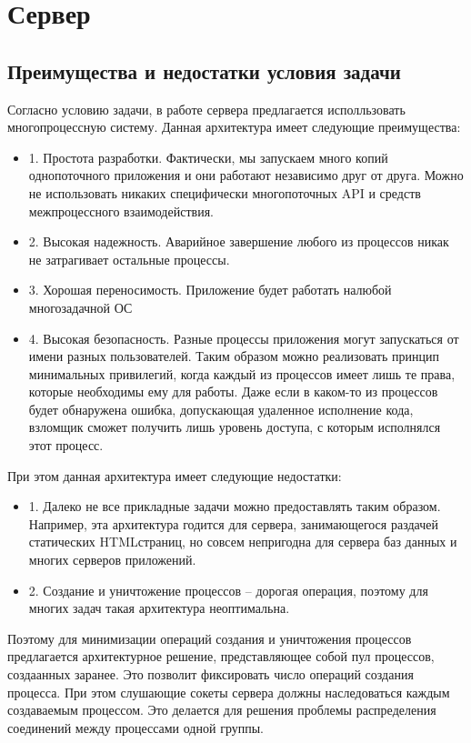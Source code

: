 \documentclass[a4paper,12pt]{report}
\begin{document}
\section*{Сервер}
\subsection*{Преимущества и недостатки условия задачи}
Согласно условию задачи, в работе сервера предлагается исполльзовать многопроцессную систему. Данная архитектура имеет следующие преимущества:
\begin{itemize}
    \item 1. Простота разработки. Фактически, мы запускаем много копий однопоточного приложения и они работают независимо друг от друга. Можно не использовать никаких специфически многопоточных API и средств межпроцессного взаимодействия.
    \item 2. Высокая надежность. Аварийное завершение любого из процессов никак не затрагивает остальные процессы.
    \item 3. Хорошая переносимость. Приложение будет работать налюбой многозадачной ОС
    \item 4. Высокая безопасность. Разные процессы приложения могут запускаться от имени разных пользователей. Таким образом можно реализовать принцип минимальных привилегий, когда каждый из процессов имеет лишь те права, которые необходимы ему для работы. Даже если в каком-то из процессов будет обнаружена ошибка, допускающая удаленное исполнение кода, взломщик сможет получить лишь уровень доступа, с которым исполнялся этот процесс.
\end{itemize}
При этом данная архитектура имеет следующие недостатки:
\begin{itemize}
    \item 1. Далеко не все прикладные задачи можно предоставлять таким образом. Например, эта архитектура годится для сервера, занимающегося раздачей статических HTMLстраниц, но совсем непригодна для сервера баз данных и многих серверов приложений.
    \item 2. Создание и уничтожение процессов – дорогая операция, поэтому для многих задач такая архитектура неоптимальна.
\end{itemize}
Поэтому для минимизации операций создания и уничтожения процессов предлагается архитектурное решение, представляющее собой пул процессов,
создаанных заранее. Это позволит фиксировать число операций создания процесса. При этом слушающие сокеты сервера должны наследоваться каждым создаваемым процессом. Это делается для решения проблемы распределения соединений между процессами одной группы. 
\end{document}
